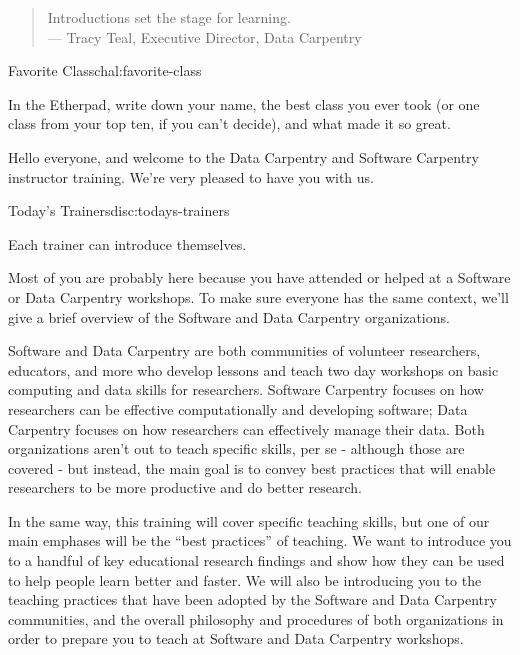 
\begin{quote}
Introductions set the stage for learning.\\--- Tracy Teal, Executive
Director, Data Carpentry
\end{quote}

\begin{challenge}{Favorite Class}{chal:favorite-class}

In the Etherpad, write down your name, the best class you ever took (or
one class from your top ten, if you can't decide), and what made it so
great.
\end{challenge}

Hello everyone, and welcome to the Data Carpentry and Software Carpentry
instructor training. We're very pleased to have you with us.

\begin{discussion}{Today's Trainers}{disc:todays-trainers}

Each trainer can introduce themselves.

\end{discussion}

Most of you are probably here because you have attended or helped at a
Software or Data Carpentry workshops. To make sure everyone has the same
context, we'll give a brief overview of the Software and Data Carpentry
organizations.

Software and Data Carpentry are both communities of volunteer
researchers, educators, and more who develop lessons and teach two day
workshops on basic computing and data skills for researchers. Software
Carpentry focuses on how researchers can be effective computationally
and developing software; Data Carpentry focuses on how researchers can
effectively manage their data. Both organizations aren't out to teach
specific skills, per se - although those are covered - but instead, the
main goal is to convey best practices that will enable researchers to be
more productive and do better research.

In the same way, this training will cover specific teaching skills, but
one of our main emphases will be the ``best practices'' of teaching. We
want to introduce you to a handful of key educational research findings
and show how they can be used to help people learn better and faster. We
will also be introducing you to the teaching practices that have been
adopted by the Software and Data Carpentry communities, and the overall
philosophy and procedures of both organizations in order to prepare you
to teach at Software and Data Carpentry workshops.

